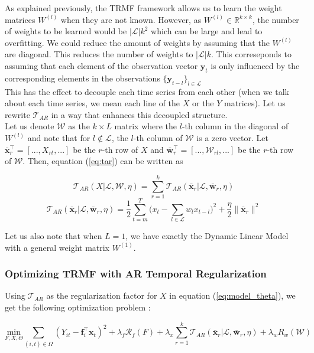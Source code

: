 \documentclass{article}
\begin{document}
As explained previously, the TRMF framework allows us to learn the weight matrices $W^{(l)}$ when they are not known. However, as $W^{(l)} \in \mathbb{R}^{k \times k}$, the number of weights to be learned would be $|\mathcal{L}|k^2$ which can be large and lead to overfitting. We could reduce the amount of weights by assuming that the $W^{(l)}$ are diagonal. This reduces the number of weights to $|\mathcal{L}|k$.
This correseponds to assuming that each element of the observation vector $\mathbf{y}_t$ is only influenced by the corresponding elements in the observations $\{\mathbf{y}_{t-l}\}_{l \in \mathcal{L}}$ \\
This has the effect to decouple each time series from each other (when we talk about each time series, we mean each line of the $X$ or the $Y$ matrices). Let us rewrite $\mathcal{T}_{AR}$ in a way that enhances this decoupled structure. \\
Let us denote $\mathcal{W}$ as the $k \times L$ matrix where the $l$-th column in the diagonal of $W^{(l)}$ and note that for $l \notin \mathcal{L}$, the $l$-th column of $\mathcal{W}$ is a zero vector.
Let $\bar{\mathbf{x}}_r^{\top} = [..., X_{rt}, ...]$ be the $r$-th row of $X$ and $\bar{\mathbf{w}}_r^{\top} = [..., \mathcal{W}_{rl}, ...]$ be the $r$-th row of $\mathcal{W}$. Then, equation (\ref{eq:tar}) can be written as


$$\mathcal{T}_{AR}(X|\mathcal{L}, \mathcal{W}, \eta) = \sum_{r=1}^k \mathcal{T}_{AR}(\bar{\mathbf{x}}_r|\mathcal{L}, \bar{\mathbf{w}}_r, \eta)$$
$$\mathcal{T}_{AR}(\bar{\mathbf{x}}_r|\mathcal{L}, \bar{\mathbf{w}}_r, \eta) = \frac{1}{2} \sum_{t=m}^T \Big(x_t - \sum_{l \in \mathcal{L}} w_l x_{t-l} \Big)^2 + \frac{\eta}{2} \|\bar{\mathbf{x}}_r\|^2$$

Let us also note that when $L = 1$, we have exactly the Dynamic Linear Model with a general weight matrix $W^{(1)}$.

\subsubsection*{Optimizing TRMF with AR Temporal Regularization}
Using $\mathcal{T}_{AR}$ as the regularization factor for $X$ in equation (\ref{eq:model_theta}), we get the following optimization problem :

\begin{equation}
\underset{F,X,\Theta}{\text{min}} \sum_{(i,t) \in \Omega} (Y_{it} - \mathbf{f}_i^\top\mathbf{x}_t)^2 + \lambda_f \mathcal{R}_f(F) + \lambda_x \sum_{r=1}^k \mathcal{T}_{AR}(\bar{\mathbf{x}}_r|\mathcal{L}, \bar{\mathbf{w}}_r, \eta) + \lambda_{w} R_{w}(\mathcal{W})
\label{eq:model_ar}
\end{equation}
\end{document}
